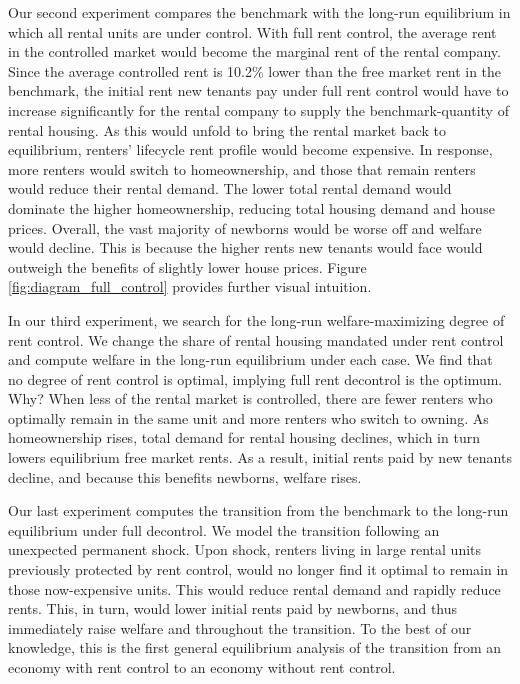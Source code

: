 \documentclass[parskip=full]{article}
\begin{document}
Our second experiment compares the benchmark with the long-run equilibrium in which all rental units are under control. With full rent control, the average rent in the controlled market would become the marginal rent of the rental company. Since the average controlled rent is 10.2\% lower than the free market rent in the benchmark, the initial rent new tenants pay under full rent control would have to increase significantly for the rental company to supply the benchmark-quantity of rental housing. As this would unfold to bring the rental market back to equilibrium, renters' lifecycle rent profile would become expensive. In response, more renters would switch to homeownership, and those that remain renters would reduce their rental demand. The lower total rental demand would dominate the higher homeownership, reducing total housing demand and house prices. Overall, the vast majority of newborns would be worse off and welfare would decline. This is because the higher rents new tenants would face would outweigh the benefits of slightly lower house prices. Figure \ref{fig:diagram_full_control} provides further visual intuition.

In our third experiment, we search for the long-run welfare-maximizing degree of rent control. We change the share of rental housing mandated under rent control and compute welfare in the long-run equilibrium under each case. We find that no degree of rent control is optimal, implying full rent decontrol is the optimum. Why? When less of the rental market is controlled, there are fewer renters who optimally remain in the same unit and more renters who switch to owning. As homeownership rises, total demand for rental housing declines, which in turn lowers equilibrium free market rents. As a result, initial rents paid by new tenants decline, and because this benefits newborns, welfare rises. 

Our last experiment computes the transition from the benchmark to the long-run equilibrium under full decontrol. We model the transition following an unexpected permanent shock. Upon shock, renters living in large rental units previously protected by rent control, would no longer find it optimal to remain in those now-expensive units. This would reduce rental demand and rapidly reduce rents. This, in turn, would lower initial rents paid by newborns, and thus immediately raise welfare and throughout the transition. To the best of our knowledge, this is the first general equilibrium analysis of the transition from an economy with rent control to an economy without rent control.
\end{document}

